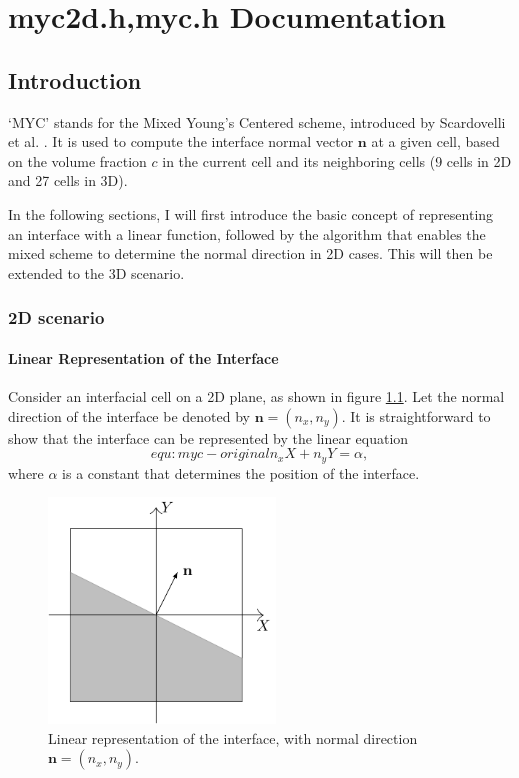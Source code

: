 \chapter{myc2d.h,myc.h Documentation}
\ifsingle
\maketitle
\fi
\chaptermeta[draft][2025-07-15]

\section{Introduction}
‘MYC’ stands for the Mixed Young’s Centered scheme, introduced by Scardovelli et al. \cite{2003_Scardovelli}. It is used to compute the interface normal vector $\mathbf{n}$ at a given cell, based on the volume fraction $c$ in the current cell and its neighboring cells (9 cells in 2D and 27 cells in 3D).

In the following sections, I will first introduce the basic concept of representing an interface with a linear function, followed by the algorithm that enables the mixed scheme to determine the normal direction in 2D cases. This will then be extended to the 3D scenario.

\subsection{2D scenario}
\subsubsection{Linear Representation of the Interface}

Consider an interfacial cell on a 2D plane, as shown in figure \ref{fig:myc-2Dlinear}. Let the normal direction of the interface be denoted by $\mathbf{n} = (n_x, n_y)$. It is straightforward to show that the interface can be represented by the linear equation
\begin{equation}{equ:myc-original}
  n_x X + n_y Y = \alpha,
\end{equation}
where $\alpha$ is a constant that determines the position of the interface.

\begin{figure}[ht]
    \centering
    \includegraphics[height=6cm]{./image/myc-h-and-myc2d-h/2Dlinear-face.pdf}
    \caption{Linear representation of the interface, with normal direction $\mathbf{n} = (n_x, n_y)$.}
    \label{fig:myc-2Dlinear}
\end{figure}

